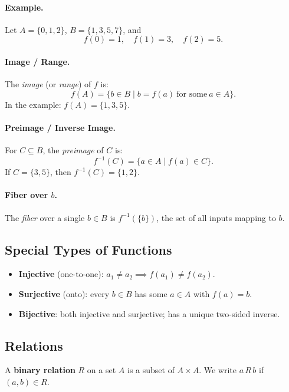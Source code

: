\documentclass[12pt]{article}
\theoremstyle{definition}
\begin{document}
\paragraph{Example.}
Let \(A = \{0,1,2\}\), \(B = \{1,3,5,7\}\), and
\[
f(0) = 1, \quad f(1) = 3, \quad f(2) = 5.
\]

\paragraph{Image / Range.}  
The \emph{image} (or \emph{range}) of \(f\) is:
\[
f(A) = \{ b \in B \mid b = f(a) \ \text{for some}\ a \in A \}.
\]
In the example: \(f(A) = \{1,3,5\}\).

\paragraph{Preimage / Inverse Image.}  
For \(C \subseteq B\), the \emph{preimage} of \(C\) is:
\[
f^{-1}(C) = \{ a \in A \mid f(a) \in C \}.
\]
If \(C = \{3,5\}\), then \(f^{-1}(C) = \{1,2\}\).

\paragraph{Fiber over \(b\).}  
The \emph{fiber} over a single \(b \in B\) is \(f^{-1}(\{b\})\), the set of all inputs mapping to \(b\).

\subsection*{Special Types of Functions}

\begin{itemize}
    \item \textbf{Injective} (one-to-one): \(a_1 \neq a_2 \implies f(a_1) \neq f(a_2)\).
    \item \textbf{Surjective} (onto): every \(b \in B\) has some \(a \in A\) with \(f(a) = b\).
    \item \textbf{Bijective}: both injective and surjective; has a unique two-sided inverse.
\end{itemize}

\subsection*{Relations}

A \textbf{binary relation} \(R\) on a set \(A\) is a subset of \(A \times A\).  
We write \(a \,R\, b\) if \((a,b) \in R\).
\end{document}
